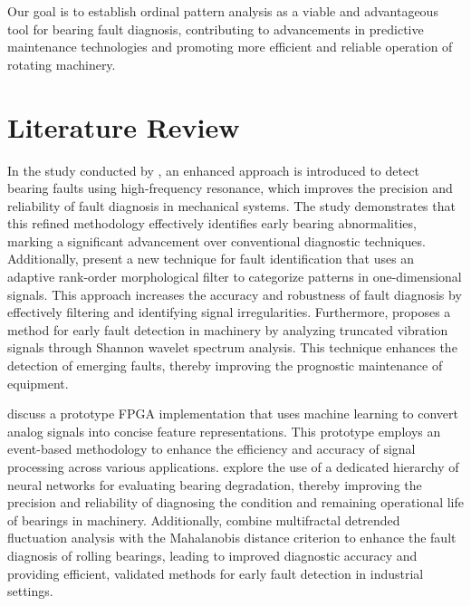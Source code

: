 \documentclass[sn-basic,pdflatex]{sn-jnl}
\theoremstyle{remark}
\theoremstyle{definition}
\begin{document}
Our goal is to establish ordinal pattern analysis as a viable and
advantageous tool for bearing fault diagnosis, contributing to
advancements in predictive maintenance technologies and promoting more
efficient and reliable operation of rotating machinery.

\section{Literature Review}\label{sec2}

In the study conducted by \citet{WOS:000312724900101}, an enhanced
approach is introduced to detect bearing faults using high-frequency
resonance, which improves the precision and reliability of fault
diagnosis in mechanical systems. The study demonstrates that this
refined methodology effectively identifies early bearing abnormalities,
marking a significant advancement over conventional diagnostic
techniques. Additionally, \citet{WOS:000301688000008} present a new
technique for fault identification that uses an adaptive rank-order
morphological filter to categorize patterns in one-dimensional signals.
This approach increases the accuracy and robustness of fault diagnosis
by effectively filtering and identifying signal irregularities.
Furthermore, \citet{WOS:000303039300034} proposes a method for early
fault detection in machinery by analyzing truncated vibration signals
through Shannon wavelet spectrum analysis. This technique enhances the
detection of emerging faults, thereby improving the prognostic
maintenance of equipment.

\citet{WOS:000345844100102} discuss a prototype FPGA implementation that
uses machine learning to convert analog signals into concise feature
representations. This prototype employs an event-based methodology to
enhance the efficiency and accuracy of signal processing across various
applications. \citet{WOS:000396580800080} explore the use of a dedicated
hierarchy of neural networks for evaluating bearing degradation, thereby
improving the precision and reliability of diagnosing the condition and
remaining operational life of bearings in machinery. Additionally,
\citet{WOS:000320835800016} combine multifractal detrended fluctuation
analysis with the Mahalanobis distance criterion to enhance the fault
diagnosis of rolling bearings, leading to improved diagnostic accuracy
and providing efficient, validated methods for early fault detection in
industrial settings.
\end{document}
